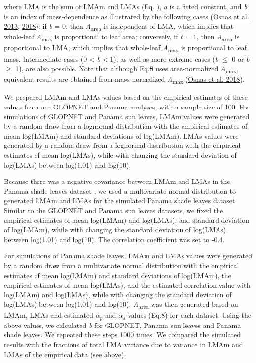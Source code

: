 \documentclass[
  12pt,
  a4paper,
,tablecaptionabove
]{scrartcl}
\providecommand{\DIFaddtex}[1]{{\protect\color{blue}\uwave{#1}}} %
\providecommand{\DIFdeltex}[1]{{\protect\color{red}\sout{#1}}}                      %
\providecommand{\DIFaddbegin}{} %
\providecommand{\DIFaddend}{} %
\providecommand{\DIFdelbegin}{} %
\providecommand{\DIFdelend}{} %
\providecommand{\DIFadd}[1]{\texorpdfstring{\DIFaddtex{#1}}{#1}} %
\providecommand{\DIFdel}[1]{\texorpdfstring{\DIFdeltex{#1}}{}} %
\newcommand{\DIFscaledelfig}{0.5}
\newlength{\DIFdelgraphicswidth} %
\newlength{\DIFdelgraphicsheight} %
\newcommand{\DIFaddincludegraphics}[2][]{{\color{blue}\fbox{\DIFOincludegraphics[#1]{#2}}}} %
\newcommand{\DIFdelincludegraphics}[2][]{%
\sbox{\DIFdelgraphicsbox}{\DIFOincludegraphics[#1]{#2}}%
\settoboxwidth{\DIFdelgraphicswidth}{\DIFdelgraphicsbox} %
\settoboxtotalheight{\DIFdelgraphicsheight}{\DIFdelgraphicsbox} %
\scalebox{\DIFscaledelfig}{%
\parbox[b]{\DIFdelgraphicswidth}{\usebox{\DIFdelgraphicsbox}\\[-\baselineskip] \rule{\DIFdelgraphicswidth}{0em}}\llap{\resizebox{\DIFdelgraphicswidth}{\DIFdelgraphicsheight}{%
\setlength{\unitlength}{\DIFdelgraphicswidth}%
\begin{picture}(1,1)%
\thicklines\linethickness{2pt} %
{\color[rgb]{1,0,0}\put(0,0){\framebox(1,1){}}}%
{\color[rgb]{1,0,0}\put(0,0){\line( 1,1){1}}}%
{\color[rgb]{1,0,0}\put(0,1){\line(1,-1){1}}}%
\end{picture}%
}\hspace*{3pt}}} %
} %
\DeclareRobustCommand{\DIFaddbegin}{\DIFOaddbegin \let\includegraphics\DIFaddincludegraphics} %
\DeclareRobustCommand{\DIFaddend}{\DIFOaddend \let\includegraphics\DIFOincludegraphics} %
\DeclareRobustCommand{\DIFdelbegin}{\DIFOdelbegin \let\includegraphics\DIFdelincludegraphics} %
\DeclareRobustCommand{\DIFdelend}{\DIFOaddend \let\includegraphics\DIFOincludegraphics} %
\begin{document}
where LMA is the sum of LMAm and LMAs (Eq.\DIFdelbegin %
\DIFdelend \DIFaddbegin \DIFadd{~\ref{eq-LMA}}\DIFaddend ), \emph{a} is a
fitted constant, and \emph{b} is an index of mass-dependence as
illustrated by the following cases
(\protect\hyperlink{ref-Osnas2013}{Osnas et al. 2013},
\protect\hyperlink{ref-Osnas2018}{2018}): if \emph{b} = 0, then
\emph{A}\textsubscript{area} is independent of LMA, which implies that
whole-leaf \emph{A}\textsubscript{max} is proportional to leaf area;
conversely, if \emph{b} = 1, then \emph{A}\textsubscript{area} is
proportional to LMA, which implies that whole-leaf
\emph{A}\textsubscript{max} is proportional to leaf mass. Intermediate
cases (0 \textless{} \emph{b} \textless{} 1), as well as more extreme
cases (\emph{b} \(\leq\) 0 or \emph{b} \(\geq\) 1), are also possible.
Note that although Eq.\DIFdelbegin \DIFdel{8 }\DIFdelend \DIFaddbegin \DIFadd{~\ref{eq-mass} }\DIFaddend uses area-normalized
\emph{A}\textsubscript{max}, equivalent results are obtained from
mass-normalized \emph{A}\textsubscript{max}
(\protect\hyperlink{ref-Osnas2018}{Osnas et al. 2018}).

We prepared LMAm and LMAs values based on the empirical estimates of
these values from our GLOPNET and Panama analyses, with a sample size of
100. For simulations of GLOPNET and Panama sun leaves, LMAm values were
generated by a random draw from a lognormal distribution with the
empirical estimates of mean log(LMAm) and standard deviations of
log(LMAm). LMAs values were generated by a random draw from a lognormal
distribution with the empirical estimates of mean log(LMAs), while with
changing the standard deviation of log(LMAs) between log(1.01) and
log(10).

Because there was a negative covariance between LMAm and LMAs in the
Panama shade leaves dataset \DIFaddbegin \DIFadd{(Fig. S\ref{fig-LMAm_LMAs})}\DIFaddend , we used a
multivariate normal distribution to generated LMAm and LMAs for the
simulated Panama shade leaves dataset. Similar to the GLOPNET and Panama
sun leaves datasets, we fixed the empirical estimates of mean log(LMAm)
and log(LMAs), and standard deviation of log(LMAm), while with changing
the standard deviation of log(LMAs) between log(1.01) and log(10). The
correlation coefficient was set to -0.4.

For simulations of Panama shade leaves, LMAm and LMAs values were
generated by a random draw from a multivariate normal distribution with
the empirical estimates of mean log(LMAm) and standard deviations of
log(LMAm), the empirical estimates of mean log(LMAs), and the estimated
correlation value with log(LMAm) and log(LMAs), while with changing the
standard deviation of log(LMAs) between log(1.01) and log(10).
\emph{A}\textsubscript{area} was then generated based on LMAm, LMAs and
estimated \(\alpha_p\) and \(\alpha_s\) values (Eq.\DIFdelbegin \DIFdel{8}\DIFdelend \DIFaddbegin \DIFadd{~\ref{eq-mass}}\DIFaddend ) for
each dataset. Using the above values, we calculated \emph{b} for
GLOPNET, Panama sun leaves and Panama shade leaves. We repeated these
steps 1000 times. We compared the simulated results with the fractions
of total LMA variance due to variance in LMAm and LMAs of the empirical
data (see above).
\end{document}
